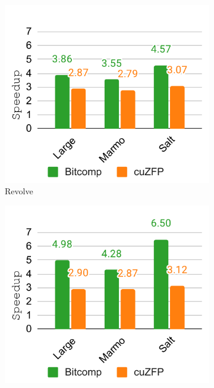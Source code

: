 \documentclass[Ingles,Final]{ic-tese-v3}
\begin{document}
\begin{figure}[h!]
    \centering

    \begin{subfigure}[b]{0.33\textwidth}
        \includegraphics[width=\textwidth]{figures/compress_speedup/speedup_compress_revolve.pdf}
        \caption{Revolve}
        \label{fig:compress_speedup_revolve}
    \end{subfigure}
    \hfill
    \begin{subfigure}[b]{0.33\textwidth}
        \includegraphics[width=\textwidth]{figures/compress_speedup/speedup_compress_zcut.pdf}

\end{subfigure}
\end{figure}
\end{document}
